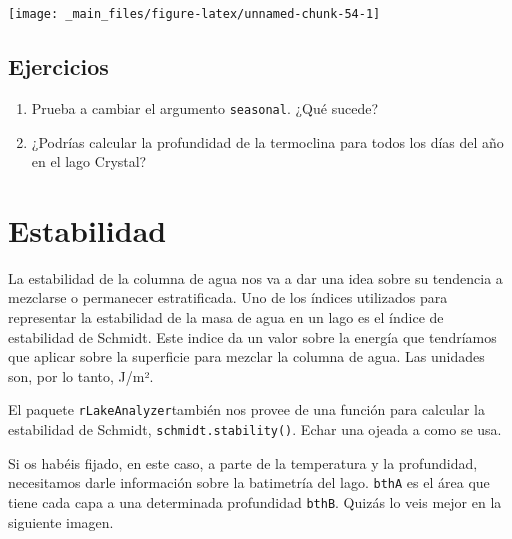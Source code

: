 \documentclass[
]{book}
\newcommand{\passthrough}[1]{#1}
\providecommand{\tightlist}{%
  \setlength{\itemsep}{0pt}\setlength{\parskip}{0pt}}
\begin{document}
\texttt{[image: \_main\_files/figure-latex/unnamed-chunk-54-1]}

\hypertarget{ejercicios-4}{%
\subsection{Ejercicios}\label{ejercicios-4}}

\begin{enumerate}
\def\labelenumi{\arabic{enumi}.}
\tightlist
\item
  Prueba a cambiar el argumento \passthrough{\lstinline!seasonal!}. ¿Qué sucede?
\item
  ¿Podrías calcular la profundidad de la termoclina para todos los días del año en el lago Crystal?
\end{enumerate}

\hypertarget{estabilidad}{%
\section{Estabilidad}\label{estabilidad}}

La estabilidad de la columna de agua nos va a dar una idea sobre su tendencia a mezclarse o permanecer estratificada. Uno de los índices utilizados para representar la estabilidad de la masa de agua en un lago es el índice de estabilidad de Schmidt. Este indice da un valor sobre la energía que tendríamos que aplicar sobre la superficie para mezclar la columna de agua. Las unidades son, por lo tanto, J/m².

El paquete \passthrough{\lstinline!rLakeAnalyzer!}también nos provee de una función para calcular la estabilidad de Schmidt, \passthrough{\lstinline!schmidt.stability()!}. Echar una ojeada a como se usa.

Si os habéis fijado, en este caso, a parte de la temperatura y la profundidad, necesitamos darle información sobre la batimetría del lago. \passthrough{\lstinline!bthA!} es el área que tiene cada capa a una determinada profundidad \passthrough{\lstinline!bthB!}. Quizás lo veis mejor en la siguiente imagen.
\end{document}
